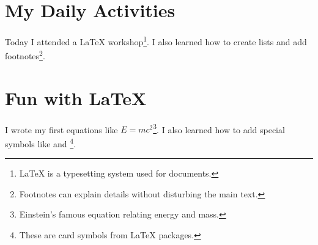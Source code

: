 \documentclass[10pt]{article}
\begin{document}
\section{My Daily Activities}

Today I attended a LaTeX workshop\footnote{LaTeX is a typesetting system used for documents.}.  
I also learned how to create lists and add footnotes\footnote{Footnotes can explain details without disturbing the main text.}.  

\section{Fun with LaTeX}

I wrote my first equations like $E=mc^2$\footnote{Einstein's famous equation relating energy and mass.}.  
I also learned how to add special symbols like and \footnote{These are card symbols from LaTeX packages.}.  
\end{document}
